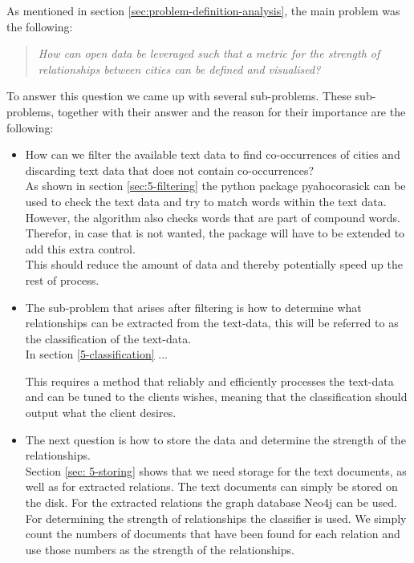 As mentioned in section \ref{sec:problem-definition-analysis}, the main problem was the following:
\begin{quote} 
\centering 
\textit{How can open data be leveraged such that a metric for the strength of relationships between cities can be defined and visualised?}
\end{quote}

To answer this question we came up with several sub-problems. These sub-problems, together with their answer and the reason for their importance are the following:
\begin{itemize}
    \item How can we filter the available text data to find co-occurrences of cities and discarding text data that does not contain co-occurrences? \\
    
    As shown in section \ref{sec:5-filtering} the python package pyahocorasick can be used to check the text data and try to match words within the text data. However, the algorithm also checks words that are part of compound words. Therefor, in case that is not wanted, the package will have to be extended to add this extra control. \\
    
    This should reduce the amount of data and thereby potentially speed up the rest of process.
    
    \item The sub-problem that arises after filtering is how to determine what relationships can be extracted from the text-data, this will be referred to as the classification of the text-data. \\
    
    In section \ref{5-classification} ... \todo{}
    
    This requires a method that reliably and efficiently processes the text-data and can be tuned to the clients wishes, meaning that the classification should output what the client desires. 
    
    \item The next question is how to store the data and determine the strength of the relationships. \\
    
    Section \ref{sec: 5-storing} shows that we need storage for the text documents, as well as for extracted relations. The text documents can simply be stored on the disk. For the extracted relations the graph database Neo4j can be used. \\
    For determining the strength of relationships the classifier is used. We simply count the numbers of documents that have been found for each relation and use those numbers as the strength of the relationships. \\
    

\end{itemize}
